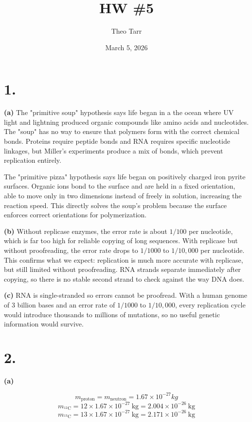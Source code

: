 \documentclass[11pt]{article}
\title{HW \#5}
\author{Theo Tarr}
\date{March 5, 2026}
\begin{document}
\maketitle

\section*{1.}

\textbf{(a)} The "primitive soup" hypothesis says life began in a the ocean where UV light and lightning produced organic compounds like amino acids and nucleotides. The "soup" has no way to ensure that polymers form with the correct chemical bonds. Proteins require peptide bonds and RNA requires specific nucleotide linkages, but Miller's experiments produce a mix of bonds, which prevent replication entirely.

The "primitive pizza" hypothesis says life began on positively charged iron pyrite surfaces. Organic ions bond to the surface and are held in a fixed orientation, able to move only in two dimensions instead of freely in solution, increasing the reaction speed. This directly solves the soup's problem because the surface enforces correct orientations for polymerization.

\textbf{(b)} Without replicase enzymes, the error rate is about $1/100$ per nucleotide, which is far too high for reliable copying of long sequences. With replicase but without proofreading, the error rate drops to $1/1000$ to $1/10{,}000$ per nucleotide. This confirms what we expect: replication is much more accurate with replicase, but still limited without proofreading. RNA strands separate immediately after copying, so there is no stable second strand to check against the way DNA does.

\textbf{(c)} RNA is single-stranded so errors cannot be proofread. With a human genome of 3 billion bases and an error rate of $1/1000$ to $1/10{,}000$, every replication cycle would introduce thousands to millions of mutations, so no useful genetic information would survive.

\section*{2.}

\textbf{(a)}

\[
m_\text{proton} = m_\text{neutron} = 1.67 \times 10^{-27} kg
\]
\[
m_{^{12}\text{C}} = 12 \times 1.67\times10^{-27}\ \text{kg} = 2.004\times10^{-26}\ \text{kg}
\]
\[
m_{^{13}\text{C}} = 13 \times 1.67\times10^{-27}\ \text{kg} = 2.171\times10^{-26}\ \text{kg}
\]
\end{document}
